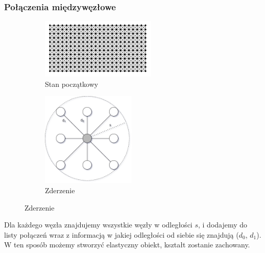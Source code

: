 \documentclass{beamer}
\begin{document}
\begin{frame}
    \frametitle{Połączenia międzywęzłowe}

    \begin{figure}[h]
        \begin{subfigure}{0.45\textwidth}
            \centering
            \includegraphics[width=5.5cm]{12x24}
            \caption{Stan początkowy}
        \end{subfigure}
        \begin{subfigure}{0.45\textwidth}
            \centering
            \includegraphics[width=4.5cm]{connections.drawio}
            \caption{Zderzenie}
        \end{subfigure}
    \end{figure}

    Dla każdego węzła znajdujemy wszystkie węzły w odległości $s$, i dodajemy do listy połączeń wraz z informacją
    w jakiej odległości od siebie się znajdują ($d_0$, $d_1$). W ten sposób możemy stworzyć elastyczny obiekt, kształt
    zostanie zachowany.
\end{frame}
\end{document}
